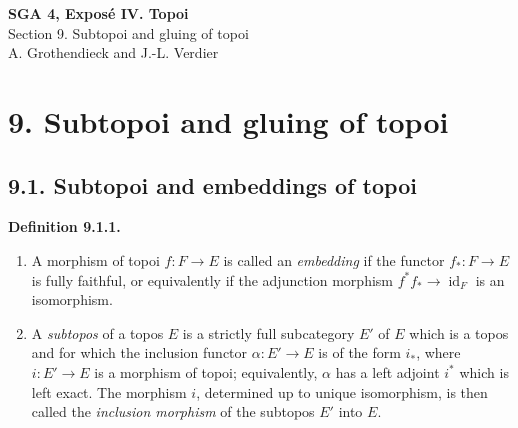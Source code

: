 \documentclass[11pt]{article}
\newcommand{\id}{\operatorname{id}}
\newenvironment{statement}[1]{\par\medskip\noindent\textbf{#1.}\ }{\par\medskip}
\begin{document}

\begin{center}
{\Large \textbf{SGA 4, Expos\'e IV. Topoi}}\\[0.35em]
{\large Section 9. Subtopoi and gluing of topoi}\\[0.25em]
{\normalsize A. Grothendieck and J.-L. Verdier}
\end{center}

\bigskip

\section*{9. Subtopoi and gluing of topoi}

\subsection*{9.1. Subtopoi and embeddings of topoi}

\begin{statement}{Definition 9.1.1}
\begin{enumerate}[label=\alph*)]
\item A morphism of topoi \(f:F\to E\) is called an \emph{embedding} if the functor
\(f_*:F\to E\) is fully faithful, or equivalently if the adjunction morphism
\(f^*f_*\to \id_F\) is an isomorphism.

\item A \emph{subtopos} of a topos \(E\) is a strictly full subcategory \(E'\) of \(E\) which is a topos and for which the inclusion functor
\(\alpha:E'\to E\) is of the form \(i_*\), where \(i:E'\to E\) is a morphism of topoi; equivalently, \(\alpha\) has a left adjoint \(i^*\) which is left exact. The morphism \(i\), determined up to unique isomorphism, is then called the \emph{inclusion morphism} of the subtopos \(E'\) into \(E\).
\end{enumerate}
\end{statement}
\end{document}

